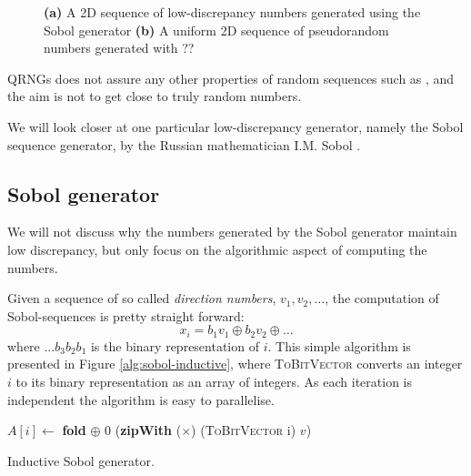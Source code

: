 \begin{figure}
	\centering

    \caption{\textbf{(a)} A 2D sequence of low-discrepancy numbers generated using
      the Sobol generator \textbf{(b)} A uniform 2D sequence of pseudorandom numbers generated with ??}
\label{fig:discrepancyplot}
\end{figure}

QRNGs does not assure any other properties of random sequences such as
, and the aim is not to get close to truly random numbers.


We will look closer at one particular low-discrepancy generator,
namely the Sobol sequence generator, by the Russian mathematician
I.M. Sobol \cite{sobol1967}. 


\subsection{Sobol generator}
We will not discuss why the numbers generated by the Sobol generator
maintain low discrepancy, but only focus on the algorithmic aspect of
computing the numbers.

Given a sequence of so called \emph{direction numbers}, $v_1, v_2,
\ldots$, the computation of Sobol-sequences is pretty straight forward:
$$x_i = b_1v_1 \oplus b_2v_2 \oplus \ldots$$
where $\ldots b_3b_2b_1$ is the binary representation of $i$. This
simple algorithm is presented in Figure \ref{alg:sobol-inductive},
where \textsc{ToBitVector} converts an integer $i$ to its binary
representation as an array of integers. As each iteration is
independent the algorithm is easy to parallelise.

\begin{algorithm}
  \begin{algorithmic}
    \State $A[i] \gets$ \textbf{fold} $\oplus$ 0 (\textbf{zipWith} ($\times$) (\textsc{ToBitVector} i) $v$)
    \EndFor
    \EndFunction
  \end{algorithmic}
  \caption{Inductive Sobol generator.}
  \label{alg:sobol-inductive}
\end{algorithm}

